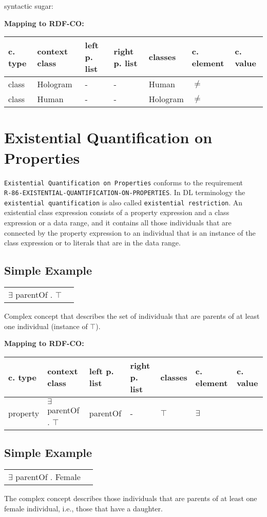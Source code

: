 \documentclass{llncs}
\newcommand{\ms}[1]{\texttt{#1}}
\newenvironment{gcotable}{
  \scriptsize
  \sffamily
  \vspace{0cm}
	\begin{center}
	\textbf{\vspace{0.4cm}Mapping to RDF-CO:} \\
  \begin{tabular}{l|l|l|l|l|l|l}
	\hline
  \textbf{c. type} & \textbf{context class} & \textbf{left p. list} & \textbf{right p. list} & \textbf{classes} & \textbf{c. element} & \textbf{c. value} \\
  \hline

}{
  \hline
  \end{tabular}
	\end{center}
}
\newenvironment{DL}{
  \vspace{0cm}
	\begin{center}
  \begin{tabular}{r l}

}{
  \end{tabular}
	\end{center}
}
\begin{document}
syntactic sugar:

\begin{gcotable}
class & Hologram & - & - & Human & $\ne$ \\
class & Human & - & - & Hologram & $\ne$ \\
\end{gcotable}

\section{Existential Quantification on Properties}

\ms{Existential Quantification on Properties} conforms to the requirement \\
\ms{R-86-EXISTENTIAL-QUANTIFICATION-ON-PROPERTIES}.
In DL terminology the \ms{existential quantification} is also called \ms{existential restriction}.
An existential class expression consists of a property expression and a class expression or a data range, and it contains all those individuals that are connected by the property expression to an individual that is an instance of the class expression or to literals that are in the data range.  

\subsection{Simple Example}

\begin{DL}
$\exists$ parentOf . $\top$
\end{DL}

Complex concept that describes the set
of individuals that are parents of at least one individual (instance of $\top$). 

\begin{gcotable}
property & $\exists$ parentOf . $\top$ & parentOf & - & $\top$ & $\exists$ \\
\end{gcotable}

\subsection{Simple Example}

\begin{DL}
$\exists$ parentOf . Female
\end{DL}

The complex concept describes those individuals that are parents of at least one
female individual, i.e., those that have a daughter.
\end{document}
